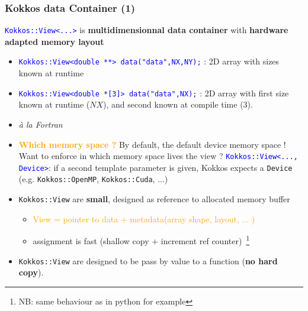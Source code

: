 \begin{frame}[fragile=singleslide]
  \frametitle{Kokkos data Container (1)}

  {\large \textcolor{blue}{\texttt{Kokkos::View<...>}} is \textbf{multidimensionnal data container} with \textbf{hardware adapted memory layout}}
  \begin{itemize}
  \item \textcolor{blue}{\texttt{Kokkos::View<double **> data("data",NX,NY);}} : 2D array with sizes known at runtime
  \item \textcolor{blue}{\texttt{Kokkos::View<double *[3]> data("data",NX);}} : 2D array with first size known at runtime ($NX$), and second known at compile time (3).
  \item {} {\it à la Fortran}
  \item \textcolor{orange}{\bf Which memory space ?} By default, the default device memory space !\\
    Want to enforce in which memory space lives the view ?
    \textcolor{blue}{\texttt{Kokkos::View<..., Device>}}: if a second template parameter is given, Kokkos expects a \texttt{Device} (e.g. \texttt{Kokkos::OpenMP}, \texttt{Kokkos::Cuda}, ...)
  \item \texttt{Kokkos::View} are \textbf{small}, designed as reference to allocated memory buffer
    \begin{itemize}
    \item \textcolor{orange}{View = pointer to data + metadata(array shape, layout, ... )}
    \item assignment is fast (shallow copy + increment ref counter)~\footnote{NB: same behaviour as in python for example}
    \end{itemize}
  \item \texttt{Kokkos::View} are designed to be pass by value to a function ({\bf no hard copy}).
  \end{itemize}

\end{frame}

